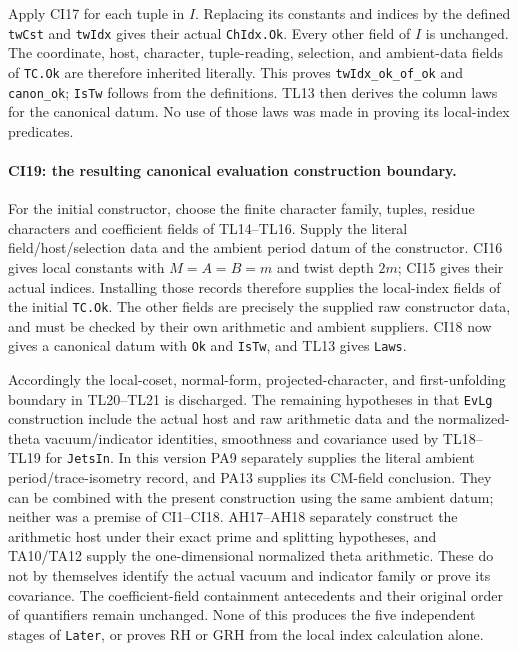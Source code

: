 Apply CI17 for each tuple in $I$. Replacing its constants and
indices by the defined \texttt{twCst} and \texttt{twIdx} gives
their actual \texttt{ChIdx.Ok}. Every other field of $I$ is
unchanged. The coordinate, host, character, tuple-reading,
selection, and ambient-data fields of \texttt{TC.Ok} are
therefore inherited literally. This proves
\texttt{twIdx\_ok\_of\_ok} and \texttt{canon\_ok};
\texttt{IsTw} follows from the definitions. TL13 then derives
the column laws for the canonical datum. No use of those laws
was made in proving its local-index predicates.

\paragraph{CI19: the resulting canonical evaluation construction boundary.}
For the initial constructor, choose the finite character family,
tuples, residue characters and coefficient fields of TL14--TL16.
Supply the literal field/host/selection data and the ambient
period datum of the constructor. CI16 gives local constants
with $M=A=B=m$ and twist depth $2m$; CI15 gives their actual
indices. Installing those records therefore supplies the
local-index fields of the initial \texttt{TC.Ok}. The other
fields are precisely the supplied raw constructor data, and
must be checked by their own arithmetic and ambient suppliers.
CI18 now gives a canonical datum with \texttt{Ok} and
\texttt{IsTw}, and TL13 gives \texttt{Laws}.

Accordingly the local-coset, normal-form, projected-character,
and first-unfolding boundary in TL20--TL21 is discharged. The
remaining hypotheses in that \texttt{EvLg} construction include
the actual host and raw arithmetic data and the normalized-theta
vacuum/indicator identities, smoothness and covariance used by
TL18--TL19 for \texttt{JetsIn}. In this version PA9 separately
supplies the literal ambient period/trace-isometry record,
and PA13 supplies its CM-field conclusion. They can be combined
with the present construction using the same ambient datum;
neither was a premise of CI1--CI18. AH17--AH18 separately construct
the arithmetic host under their exact prime and splitting hypotheses,
and TA10/TA12 supply the one-dimensional normalized theta arithmetic.
These do not by themselves identify the actual vacuum and indicator
family or prove its covariance. The coefficient-field containment
antecedents and their original order of quantifiers remain
unchanged. None of this produces the five independent stages
of \texttt{Later}, or proves RH or GRH from the local index
calculation alone.
